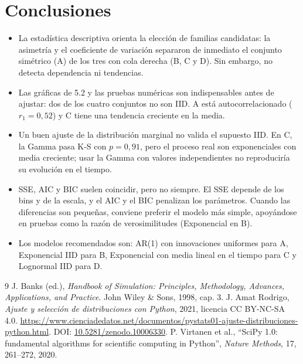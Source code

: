 \documentclass[11pt,a4paper]{article}
\begin{document}
\section{Conclusiones}
\begin{itemize}
 \item La estadística descriptiva orienta la elección de familias candidatas: la asimetría y el
 coeficiente de variación separaron de inmediato el conjunto simétrico (A) de los tres con cola
 derecha (B, C y D). Sin embargo, no detecta dependencia ni tendencias.
 \item Las gráficas de 5.2 y las pruebas numéricas son indispensables antes de ajustar: dos de los
 cuatro conjuntos no son IID. A está autocorrelacionado ($r_1=0{,}52$) y C tiene una tendencia
 creciente en la media.
 \item Un buen ajuste de la distribución marginal no valida el supuesto IID. En C, la Gamma pasa
 K-S con $p=0{,}91$, pero el proceso real son exponenciales con media creciente; usar la Gamma con
 valores independientes no reproduciría su evolución en el tiempo.
 \item SSE, AIC y BIC suelen coincidir, pero no siempre. El SSE depende de los bins y de la escala, y
 el AIC y el BIC penalizan los parámetros. Cuando las diferencias son pequeñas, conviene preferir
 el modelo más simple, apoyándose en pruebas como la razón de verosimilitudes (Exponencial en B).
 \item Los modelos recomendados son: AR(1) con innovaciones uniformes para A, Exponencial IID para
 B, Exponencial con media lineal en el tiempo para C y Lognormal IID para D.
\end{itemize}

\begin{thebibliography}{9}
 J. Banks (ed.), \textit{Handbook of Simulation: Principles, Methodology,
Advances, Applications, and Practice}. John Wiley \& Sons, 1998, cap. 3.
 J. Amat Rodrigo, \textit{Ajuste y selección de distribuciones con Python},
2021, licencia CC BY-NC-SA 4.0.
\url{https://www.cienciadedatos.net/documentos/pystats01-ajuste-distribuciones-python.html}.
DOI: \href{https://doi.org/10.5281/zenodo.10006330}{10.5281/zenodo.10006330}.
 P. Virtanen et al., ``SciPy 1.0: fundamental algorithms for scientific computing
in Python'', \textit{Nature Methods}, 17, 261--272, 2020.
\end{thebibliography}
\end{document}
